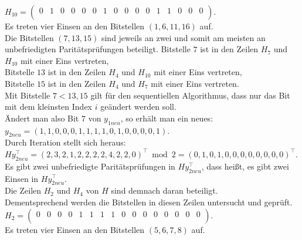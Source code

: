\begin{Beispiel}
    $H_{10}= \left( \begin{array}{rrrrrrrrrrrrrrrr}
        0 & 1 & 0 & 0 & 0 & 0 & 1 & 0 & 0 & 0 & 0 & 1 & 1 & 0 & 0 & 0 \\
       \end{array}\right). 
    $\\
    Es treten vier Einsen an den Bitstellen $(1, 6, 11, 16)$ auf.\\
    
    Die Bitstellen $(7, 13, 15)$ sind jeweils an zwei und somit am meisten an unbefriedigten Paritätsprüfungen beteiligt.
    Bitstelle $7$ ist in den Zeilen $H_7$ und $H_{10}$ mit einer Eins vertreten,\\
    Bitstelle $13$ ist in den Zeilen $H_4$ und $H_{10}$ mit einer Eins vertreten,\\
    Bitstelle $15$ ist in den Zeilen $H_4$ und $H_7$ mit einer Eins vertreten.\\
    Mit Bitstelle $7 < 13, 15$ gilt für den sequentiellen Algorithmus, dass nur das Bit mit dem kleinsten Index $i$ geändert werden soll.\\
    
    Ändert man also Bit $7$ von $y_{1neu}$, so erhält man ein neues:\\
    $y_{2neu} = (1,1,0,0,0,1,1,1,1,0,1,0,0,0,0,1).$\\
    
    Durch Iteration stellt sich heraus:\\
    $Hy_{2neu}^\intercal = (2,3,2,1,2,2,2,2,4,2,2,0)^\intercal \bmod 2 = (0,1,0,1,0,0,0,0,0,0,0,0)^\intercal$.\\
    
    Es gibt zwei unbefriedigte Paritätsprüfungen in $Hy_{2neu}^\intercal$, 
    dass hei\ss{}t, es gibt zwei Einsen in $Hy_{2neu}^\intercal.$\\
    Die Zeilen $H_2$ und $H_4$ von $H$ sind demnach daran beteiligt.\\ 
    Dementsprechend werden die Bitstellen in diesen Zeilen untersucht und geprüft.\\
    
    $H_2= \left( \begin{array}{rrrrrrrrrrrrrrrr}
        0 & 0 & 0 & 0 & 1 & 1 & 1 & 1 & 0 & 0 & 0 & 0 & 0 & 0 & 0 & 0 \\
       \end{array}\right). 
    $\\
    Es treten vier Einsen an den Bitstellen $(5, 6, 7, 8)$ auf.\\
    \pagebreak
    

\end{Beispiel}
